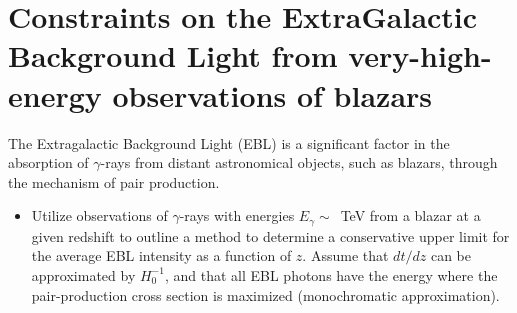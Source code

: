 \section{Constraints on the ExtraGalactic Background Light from very-high-energy observations of blazars}

The Extragalactic Background Light (EBL) is a significant factor in the absorption of $\gamma$-rays from distant astronomical objects, such as blazars, through the mechanism of pair production. 

\begin{itemize}
\item Utilize observations of $\gamma$-rays with energies $E_\gamma \sim$~TeV from a blazar at a given redshift to outline a method to determine a conservative upper limit for the average EBL intensity as a function of $z$. Assume that $dt/dz$ can be approximated by $H_0^{-1}$, and that all EBL photons have the energy where the pair-production cross section is maximized (monochromatic approximation).
\end{itemize}
